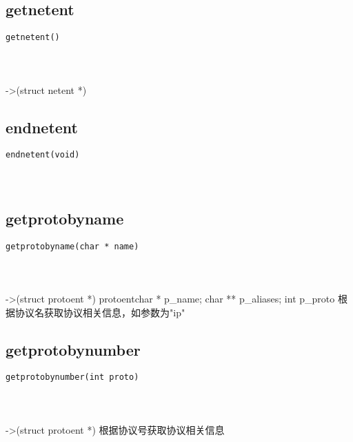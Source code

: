 \documentclass[10pt,a4paper]{article}
\begin{document}
\subsection{getnetent}
\begin{spacing}{2.0}
\lstset{language=C,numbers=none}
\begin{lstlisting}
getnetent()
\end{lstlisting}
\paragraph{ \ \ }->(struct netent *)
\end{spacing}

\subsection{endnetent}
\begin{spacing}{2.0}
\lstset{language=C,numbers=none}
\begin{lstlisting}
endnetent(void)
\end{lstlisting}
{\large\color[rgb]{0.2,0.4,0.6}{void:}}
\paragraph{ \ \ }
\end{spacing}

\subsection{getprotobyname}
\begin{spacing}{2.0}
\lstset{language=C,numbers=none}
\begin{lstlisting}
getprotobyname(char * name)
\end{lstlisting}
{\large\color[rgb]{0.2,0.4,0.6}{name:}}
\paragraph{ \ \ }->(struct protoent *) protoent{char * p\_name; char ** p\_aliases; int p\_proto} 根据协议名获取协议相关信息，如参数为"ip"
\end{spacing}

\subsection{getprotobynumber}
\begin{spacing}{2.0}
\lstset{language=C,numbers=none}
\begin{lstlisting}
getprotobynumber(int proto)
\end{lstlisting}
{\large\color[rgb]{0.2,0.4,0.6}{proto:}}
\paragraph{ \ \ }->(struct protoent *) 根据协议号获取协议相关信息
\end{spacing}
\end{document}
